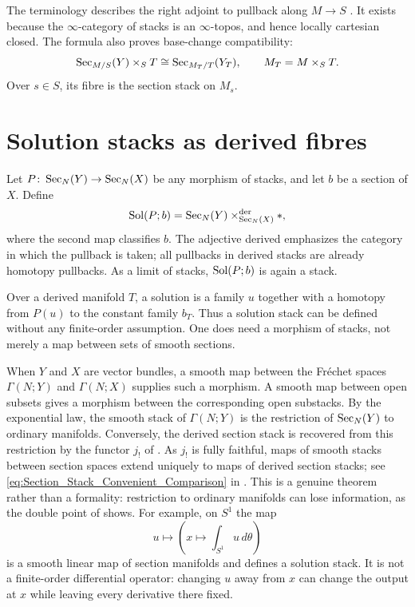 
The terminology describes the right adjoint to pullback along $M\to S$
\cite[Definition~3.2.1]{Steffens_Representability_Elliptic_Moduli}.
It exists because the $\infty$-category of stacks is an $\infty$-topos,
and hence locally cartesian closed.
The formula also proves base-change compatibility:
\[
 \operatorname{Sec}_{M/S}(Y)\times_S T
 \cong\operatorname{Sec}_{M_T/T}(Y_T),
 \qquad M_T=M\times_S T.
\]
Over $s\in S$, its fibre is the section stack on $M_s$.

\section{Solution stacks as derived fibres}

Let $P\colon\operatorname{Sec}_N(Y)\to\operatorname{Sec}_N(X)$ be any morphism of stacks, and let
$b$ be a section of $X$. Define
\begin{equation}\label{eq:Solution_Stack_Inhomogeneous}
 \operatorname{Sol}(P;b)=\operatorname{Sec}_N(Y)\times_{\operatorname{Sec}_N(X)}^{\mathrm{der}}*,
\end{equation}
where the second map classifies $b$.
The adjective derived emphasizes the category in which the pullback is
taken; all pullbacks in derived stacks are already homotopy pullbacks.
As a limit of stacks, $\operatorname{Sol}(P;b)$ is again a stack.

Over a derived manifold $T$, a solution is a family $u$ together with a
homotopy from $P(u)$ to the constant family $b_T$.
Thus a solution stack can be defined without any finite-order assumption.
One does need a morphism of stacks, not merely a map between sets
of smooth sections.

When $Y$ and $X$ are vector bundles, a smooth map between the Fr\'echet
spaces $\Gamma(N;Y)$ and $\Gamma(N;X)$ supplies such a morphism.
A smooth map between open subsets gives a morphism between the
corresponding open substacks. By the exponential law, the smooth stack of
$\Gamma(N;Y)$ is the restriction of $\operatorname{Sec}_N(Y)$ to ordinary manifolds.
Conversely, the derived section stack is recovered from this restriction
by the functor $j_!$ of 
\cite[Lemma~3.2.11]{Steffens_Representability_Elliptic_Moduli}. As $j_!$
is fully faithful, maps of smooth stacks between section spaces extend
uniquely to maps of derived section stacks; see
\eqref{eq:Section_Stack_Convenient_Comparison} in
. This is a
genuine theorem rather than a formality: restriction to ordinary
manifolds can lose information, as the double point of
 shows. For example, on $S^1$
the map
\[
 u\longmapsto\left(x\longmapsto\int_{S^1}u\,d\theta\right)
\]
is a smooth linear map of section manifolds and defines a solution stack.
It is not a finite-order differential operator: changing $u$ away from
$x$ can change the output at $x$ while leaving every derivative there fixed.

